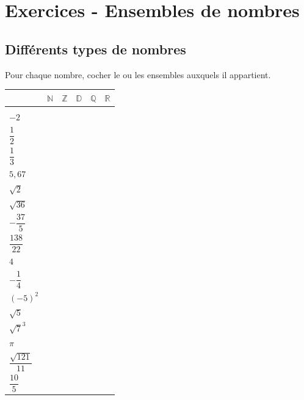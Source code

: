 \section*{Exercices - Ensembles de nombres}
{\setlength{\columnseprule}{0pt}
\setcounter{NumEx}{1}

\subsection*{Différents types de nombres}


\begin{Exercice} Pour chaque nombre, cocher le ou les ensembles auxquels il appartient.
\begin{center}
\renewcommand{\arraystretch}{2.5}
\begin{tabular}{|>{\centering\arraybackslash}p{2 cm}|>{\centering\arraybackslash}p{2 cm}|>{\centering\arraybackslash}p{2 cm}|>{\centering\arraybackslash}p{2 cm}|>{\centering\arraybackslash}p{2 cm}|>{\centering\arraybackslash}p{2 cm}|}
\arrayrulecolor{Couleur6}\hline 
 & $\mathbb{N}$ & $\mathbb{Z}$ & $\mathbb{D}$ & $\mathbb{Q}$ & $\mathbb{R}$ \\ 
\hline 
3 &  &  &  &  &  \\ 
\hline 
$-2$ &  &  &  &  &  \\ 
\hline 
$\dfrac{1}{2}$ &  &  &  &  &  \\ 
\hline 
$\dfrac{1}{3}$ &  &  &  &  &  \\ 
\hline 
$5,67$ &  &  &  &  &  \\ 
\hline 
$\sqrt{2}$ &  &  &  &  &  \\ 
\hline 
$\sqrt{36}$ &  &  &  &  &  \\ 
\hline 
$-\dfrac{37}{5}$ &  &  &  &  &  \\ 
\hline 
$\dfrac{138}{22}$ &  &  &  &  &  \\ 
\hline 
$4$ &  &  &  &  &  \\ 
\hline 
$-\dfrac{1}{4}$ &  &  &  &  &  \\ 
\hline 
$(-5)^2$ &  &  &  &  &  \\ 
\hline 
$\sqrt{5}$ &  &  &  &  &  \\ 
\hline 
$\sqrt{7}^3$ &  &  &  &  &  \\ 
\hline 
$\pi$ &  &  &  &  &  \\ 
\hline 
$\dfrac{\sqrt{121}}{11}$ &  &  &  &  &  \\ 
\hline 
$\dfrac{10}{5}$ &  &  &  &  &  \\ 
\hline 
\end{tabular} 
\end{center}
\end{Exercice}

}

